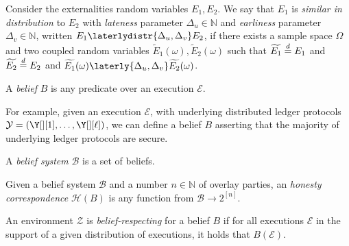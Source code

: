 
\begin{definition}
  Consider the externalities random variables $E_1, E_2$.
  We say that $E_1$ is \emph{similar in distribution} to $E_2$
  with \emph{lateness} parameter $\Delta_u \in \mathbb{N}$
  and \emph{earliness} parameter $\Delta_v \in \mathbb{N}$,
  written $E_1 \laterlydistr{\Delta_u,\Delta_v} E_2$, if
  there exists a sample space $\Omega$ and two coupled
  random variables $\widetilde{E}_1(\omega), \widetilde{E}_2(\omega)$
  such that $\widetilde{E_1} \distreq E_1$ and $\widetilde{E_2} \distreq E_2$
  and $\widetilde{E_1}(\omega) \laterly{\Delta_u,\Delta_v} \widetilde{E_2}(\omega)$.
\end{definition}

\begin{definition}[Belief]
  A \emph{belief} $B$ is any predicate over an execution $\mathcal{E}$.
\end{definition}

For example, given an execution $\mathcal{E}$, with underlying distributed ledger
protocols $\mathcal{Y} = (\Y[][1], \ldots, \Y[][\ell])$, we can define a belief
$B$ asserting that the majority of underlying ledger protocols are secure.

\begin{definition}
  A \emph{belief system} $\mathcal{B}$ is a set of beliefs.
\end{definition}

\begin{definition}
  Given a belief system $\mathcal{B}$ and a number $n \in \mathbb{N}$ of overlay parties,
  an \emph{honesty correspondence} $\mathcal{H}(B)$ is any function
  from $\mathcal{B} \longrightarrow 2^{[n]}$.
\end{definition}

\begin{definition}
  An environment $\mathcal{Z}$ is \emph{belief-respecting} for a belief $B$
  if for all executions $\mathcal{E}$ in the support of
  a given distribution of executions, it holds that $B(\mathcal{E})$.
\end{definition}


